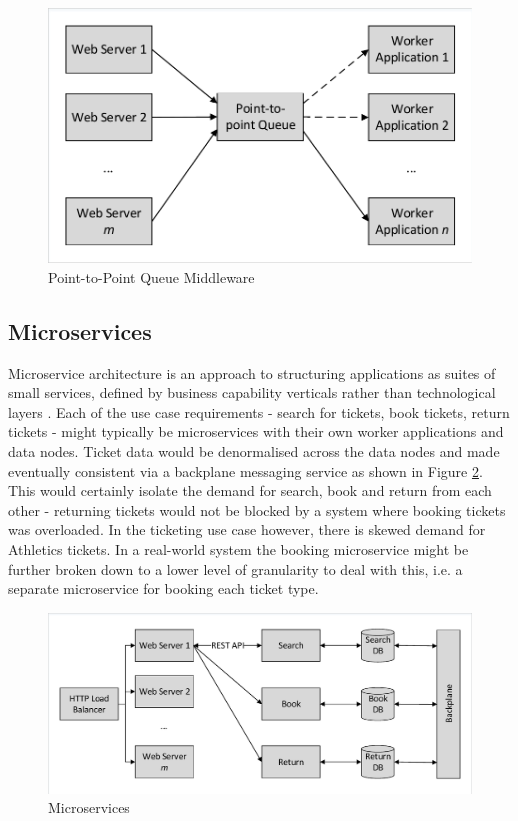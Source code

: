 \begin{figure}
	\caption{Point-to-Point Queue Middleware}
	\label{figure:queuemiddleware}
	\centering
	\includegraphics[trim = 5 5 5 5, clip, width=\textwidth]{img/p2pq}
\end{figure}


%
%
\FloatBarrier
\subsection{Microservices}\label{sec:microservices}

Microservice architecture is an approach to structuring applications as suites of small services, defined by business capability verticals rather than technological layers \cite{RN1069} \cite{RN1070}.  Each of the use case requirements - search for tickets, book tickets, return tickets - might typically be microservices with their own worker applications and data nodes.  Ticket data would be denormalised across the data nodes and made eventually consistent via a backplane messaging service \cite{RN1071} as shown in Figure \ref{figure:microservices}.  This would certainly isolate the demand for search, book and return from each other - returning tickets would not be blocked by a system where booking tickets was overloaded.  In the ticketing use case however, there is skewed demand for Athletics tickets.  In a real-world system the booking microservice might be further broken down to a lower level of granularity to deal with this, i.e. a separate microservice for booking each ticket type.

\begin{figure}
\caption{Microservices}
\label{figure:microservices}
\centering
\includegraphics[trim = 5 5 5 5, clip, width=\textwidth]{img/microservices}
\end{figure}

